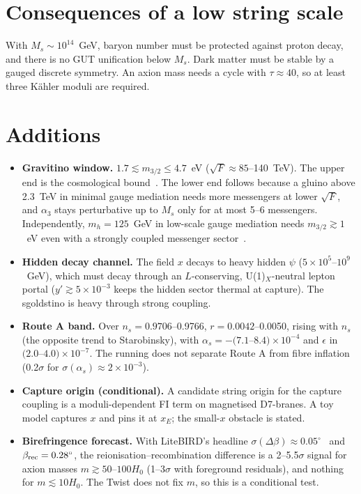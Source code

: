 \documentclass[aps,prd,twocolumn,superscriptaddress,nofootinbib,showkeys]{revtex4-2}
\begin{document}
\section{Consequences of a low string scale}
With $M_s\sim10^{14}$~GeV, baryon number must be protected against proton decay, and there is no GUT unification below $M_s$. Dark matter must be stable by a gauged discrete symmetry. An axion mass needs a cycle with $\tau\approx40$, so at least three K\"ahler moduli are required.

\section{Additions}
\begin{itemize}
\item \textbf{Gravitino window.} $1.7\lesssim m_{3/2}\le4.7$~eV ($\sqrt F\approx85$--140~TeV). The upper end is the cosmological bound~\cite{grav}. The lower end follows because a gluino above 2.3~TeV in minimal gauge mediation needs more messengers at lower $\sqrt F$, and $\alpha_3$ stays perturbative up to $M_s$ only for at most 5--6 messengers. Independently, $m_h=125$~GeV in low-scale gauge mediation needs $m_{3/2}\gtrsim1$~eV even with a strongly coupled messenger sector~\cite{msg}.
\item \textbf{Hidden decay channel.} The field $x$ decays to heavy hidden $\psi$ ($5\times10^5$--$10^9$~GeV), which must decay through an $L$-conserving, U(1)$_X$-neutral lepton portal ($y'\gtrsim5\times10^{-3}$ keeps the hidden sector thermal at capture). The sgoldstino is heavy through strong coupling.
\item \textbf{Route A band.} Over $n_s=0.9706$--0.9766, $r=0.0042$--0.0050, rising with $n_s$ (the opposite trend to Starobinsky), with $\alpha_s=-(7.1$--$8.4)\times10^{-4}$ and $\epsilon$ in $(2.0$--$4.0)\times10^{-7}$. The running does not separate Route A from fibre inflation (0.2$\sigma$ for $\sigma(\alpha_s)\approx2\times10^{-3}$).
\item \textbf{Capture origin (conditional).} A candidate string origin for the capture coupling is a moduli-dependent FI term on magnetised D7-branes. A toy model captures $x$ and pins it at $x_E$; the small-$x$ obstacle is stated.
\item \textbf{Birefringence forecast.} With LiteBIRD's headline $\sigma(\Delta\beta)\approx0.05^\circ$~\cite{LB} and $\beta_{\rm rec}=0.28^\circ$, the reionisation--recombination difference is a 2--5.5$\sigma$ signal for axion masses $m\gtrsim50$--$100H_0$ (1--3$\sigma$ with foreground residuals), and nothing for $m\lesssim10H_0$. The Twist does not fix $m$, so this is a conditional test.
\end{itemize}
\end{document}
